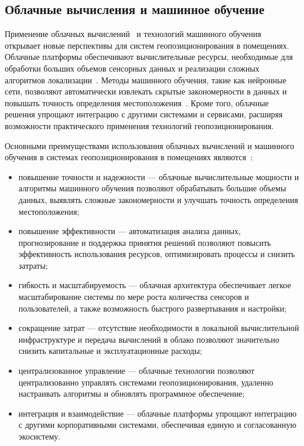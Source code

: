 
\subsection{Облачные вычисления и машинное обучение}

Применение облачных вычислений~\cite{cloudcomp} и технологий машинного обучения~\cite{mltech} открывает новые перспективы для систем геопозиционирования в помещениях. Облачные платформы обеспечивают вычислительные ресурсы, необходимые для обработки больших объемов сенсорных данных и реализации сложных алгоритмов локализации~\cite{cloudML}. Методы машинного обучения, такие как нейронные сети, позволяют автоматически извлекать скрытые закономерности в данных и повышать точность определения местоположения~\cite{mltech}. Кроме того, облачные решения упрощают интеграцию с другими системами и сервисами, расширяя возможности практического применения технологий геопозиционирования.

Основными преимуществами использования облачных вычислений и машинного обучения в системах геопозиционирования в помещениях являются~\cite{cloudML}:

\begin{itemize}[label=---]
    \item повышение точности и надежности --- облачные вычислительные мощности и алгоритмы машинного обучения позволяют обрабатывать большие объемы данных, выявлять сложные закономерности и улучшать точность определения местоположения;
    \item повышение эффективности --- автоматизация анализа данных, прогнозирование и поддержка принятия решений позволяют повысить эффективность использования ресурсов, оптимизировать процессы и снизить затраты;
    \item гибкость и масштабируемость --- облачная архитектура обеспечивает легкое масштабирование системы по мере роста количества сенсоров и пользователей, а также возможность быстрого развертывания и настройки;
    \item сокращение затрат --- отсутствие необходимости в локальной вычислительной инфраструктуре и передача вычислений в облако позволяют значительно снизить капитальные и эксплуатационные расходы;
    \item централизованное управление --- облачные технологии позволяют централизованно управлять системами геопозиционирования, удаленно настраивать алгоритмы и обновлять программное обеспечение;
    \item интеграция и взаимодействие --- облачные платформы упрощают интеграцию с другими корпоративными системами, обеспечивая единую и согласованную экосистему.
\end{itemize}

